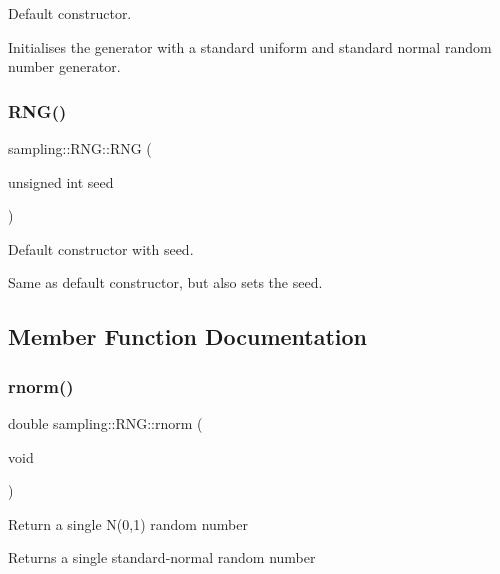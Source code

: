 Default constructor.

Initialises the generator with a standard uniform and standard normal random number generator. \mbox{\label{classsampling_1_1RNG_a2fa1a6176fc0fbc96a5c4a4ead6d7927}} 
\subsubsection{\texorpdfstring{R\+N\+G()}{RNG()}\hspace{0.1cm}{\footnotesize\ttfamily [2/2]}}
{\footnotesize\ttfamily sampling\+::\+R\+N\+G\+::\+R\+NG (\begin{DoxyParamCaption}\item[{unsigned int}]{seed }\end{DoxyParamCaption})}

Default constructor with seed.

Same as default constructor, but also sets the seed. 

\subsection{Member Function Documentation}
\mbox{\label{classsampling_1_1RNG_af16b7ef97abf5c1e5cd03f301bbdb8b2}} 
\subsubsection{\texorpdfstring{rnorm()}{rnorm()}}
{\footnotesize\ttfamily double sampling\+::\+R\+N\+G\+::rnorm (\begin{DoxyParamCaption}\item[{void}]{ }\end{DoxyParamCaption})}

Return a single N(0,1) random number \begin{DoxyReturn}{Returns}
a single standard-\/normal random number 
\end{DoxyReturn}
\mbox{\label{classsampling_1_1RNG_aec538d8d9798abae38de908f69784421}} 
